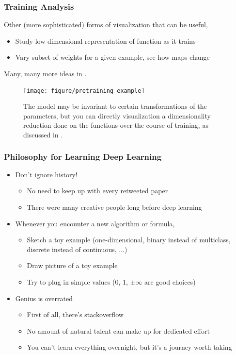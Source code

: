 \documentclass[10pt,mathserif]{beamer}
\begin{document}
\begin{frame}
  \frametitle{Training Analysis}
  Other (more sophisticated) forms of visualization that can be useful,
  \begin{itemize}
  \item Study low-dimensional representation of function as it trains
  \item Vary subset of weights for a given example, see how maps change
  \end{itemize}
  Many, many more ideas in \citep{bengio2012practical}.
\begin{figure}[ht]
  \centering
  \texttt{[image: figure/pretraining\_example]}
  \caption{The model may be invariant to certain transformations of the
    parameters, but you can directly visualization a dimensionality reduction
    done on the functions over the course of training, as discussed in
    \citep{erhan2010does}. \label{fig:pretraining_example} }
\end{figure}

\end{frame}

\begin{frame}
  \frametitle{Philosophy for Learning Deep Learning}
  \begin{itemize}
  \item Don't ignore history!
    \begin{itemize}
    \item No need to keep up with every retweeted paper
    \item There were many creative people long before deep learning
    \end{itemize}
  \item Whenever you encounter a new algorithm or formula,
    \begin{itemize}
    \item Sketch a toy example (one-dimensional, binary instead of multiclass,
      discrete instead of continuous, ...)
    \item Draw picture of a toy example
    \item Try to plug in simple values (0, 1, $\pm \infty$ are good choices)
    \end{itemize}
  \item Genius is overrated
    \begin{itemize}
    \item First of all, there's stackoverflow
    \item No amount of natural talent can make up for dedicated effort
    \item You can't learn everything overnight, but it's a journey worth taking
    \end{itemize}
  \end{itemize}
\end{frame}

\begin{frame}[allowframebreaks]
  
    
\end{frame}
\end{document}
